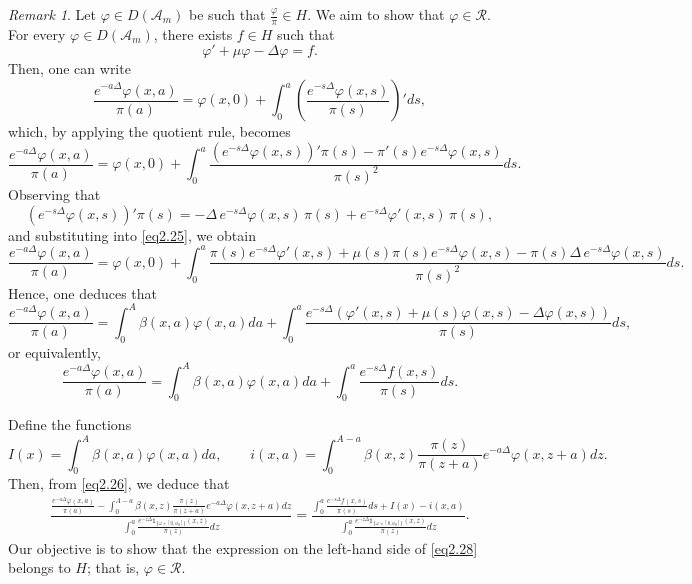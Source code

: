 \documentclass[10pt, a4]{amsart}
\theoremstyle{plain}
\theoremstyle{definition}
\theoremstyle{remark}
\newtheorem{remark}[lemma]{Remark}
\numberwithin{equation}{section}
\begin{document}
\begin{remark}\label{re2.4}
Let \(\varphi \in D(\mathcal{A}_m)\) be such that \(\frac{\varphi}{\pi} \in H\). We aim to show that \(\varphi \in \mathcal{R}\). For every \(\varphi \in D(\mathcal{A}_m)\), there exists \(f \in H\) such that
\[
\varphi' + \mu \varphi - \Delta \varphi = f.
\]
Then, one can write
\[
\frac{e^{-a\Delta}\varphi(x,a)}{\pi(a)} = \varphi(x,0) + \int_0^a \left( \frac{e^{-s\Delta}\varphi(x,s)}{\pi(s)} \right)' ds,
\]
which, by applying the quotient rule, becomes
\begin{equation}\label{eq2.25}
\frac{e^{-a\Delta}\varphi(x,a)}{\pi(a)} = \varphi(x,0) + \int_0^a \frac{\left(e^{-s\Delta}\varphi(x,s)\right)' \pi(s) - \pi'(s) e^{-s\Delta}\varphi(x,s)}{\pi(s)^2} ds.
\end{equation}
Observing that
\[
\left(e^{-s\Delta}\varphi(x,s)\right)' \pi(s) = -\Delta \,e^{-s\Delta}\varphi(x,s) \,\pi(s) + e^{-s\Delta}\varphi'(x,s)\,\pi(s),
\]
and substituting into \eqref{eq2.25}, we obtain
\[
\frac{e^{-a\Delta}\varphi(x,a)}{\pi(a)} = \varphi(x,0) + \int_0^a \frac{\pi(s)e^{-s\Delta}\varphi'(x,s) + \mu(s)\pi(s)e^{-s\Delta}\varphi(x,s) - \pi(s)\Delta\,e^{-s\Delta}\varphi(x,s)}{\pi(s)^2} ds.
\]
Hence, one deduces that
\[
\frac{e^{-a\Delta}\varphi(x,a)}{\pi(a)} = \int_0^A \beta(x,a)\varphi(x,a)da + \int_0^a \frac{e^{-s\Delta}\left(\varphi'(x,s) + \mu(s)\varphi(x,s) - \Delta\varphi(x,s)\right)}{\pi(s)} ds,
\]
or equivalently,
\begin{equation}\label{eq2.26}
\frac{e^{-a\Delta}\varphi(x,a)}{\pi(a)} = \int_0^A \beta(x,a)\varphi(x,a)da + \int_0^a \frac{e^{-s\Delta}f(x,s)}{\pi(s)} ds.
\end{equation}

Define the functions
\[
I(x)=\int_0^A \beta(x,a)\varphi(x,a)da, \qquad i(x,a)=\int_0^{A-a} \beta(x,z)\frac{\pi(z)}{\pi(z+a)}e^{-a\Delta}\varphi(x,z+a)dz.
\]
Then, from \eqref{eq2.26}, we deduce that
\begin{align}\label{eq2.28}
    \frac{\frac{e^{-a\Delta}\varphi(x,a)}{\pi(a)} - \displaystyle\int_0^{A-a}\beta(x,z)\frac{\pi(z)}{\pi(z+a)}e^{-a\Delta}\varphi(x,z+a)dz}{\displaystyle\int_0^a \frac{e^{-z\Delta}\mathds{1}_{\{\omega\times[0,a_0]\}}(x,z)}{\pi(z)}dz} = \frac{\displaystyle\int_0^a \frac{e^{-s\Delta}f(x,s)}{\pi(s)}ds + I(x)- i(x,a)}{\displaystyle\int_0^a \frac{e^{-z\Delta}\mathds{1}_{\{\omega\times[0,a_0]\}}(x,z)}{\pi(z)}dz}.
\end{align}
Our objective is to show that the expression on the left-hand side of \eqref{eq2.28} belongs to \(H\); that is, \(\varphi \in \mathcal{R}\).


\end{remark}
\end{document}
